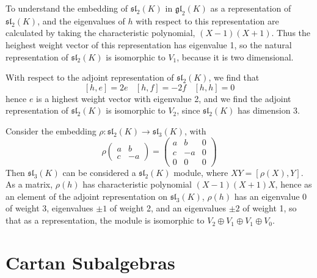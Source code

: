 \begin{example}
    To understand the embedding of $\mathfrak{sl}_2(K)$ in $\mathfrak{gl}_2(K)$ as a representation of $\mathfrak{sl}_2(K)$, and the eigenvalues of $h$ with respect to this representation are calculated by taking the characteristic polynomial, $(X - 1)(X + 1)$. Thus the heighest weight vector of this representation has eigenvalue 1, so the natural representation of $\mathfrak{sl}_2(K)$ is isomorphic to $V_1$, because it is two dimensional.
\end{example}

\begin{example}
    With respect to the adjoint representation of $\mathfrak{sl}_2(K)$, we find that
    \[ [h,e] = 2e\ \ \ \ [h,f] = -2f\ \ \ \ [h,h] = 0 \]
    hence $e$ is a highest weight vector with eigenvalue 2, and we find the adjoint representation of $\mathfrak{sl}_2(K)$ is isomorphic to $V_2$, since $\mathfrak{sl}_2(K)$ has dimension 3.
\end{example}

\begin{example}
    Consider the embedding $\rho: \mathfrak{sl}_2(K) \to \mathfrak{sl}_3(K)$, with
    \[ \rho \begin{pmatrix} a & b \\ c & -a \end{pmatrix} = \begin{pmatrix} a & b & 0 \\ c & -a & 0 \\ 0 & 0 & 0 \end{pmatrix} \]
    Then $\mathfrak{sl}_3(K)$ can be considered a $\mathfrak{sl}_2(K)$ module, where $XY = [\rho(X),Y]$. As a matrix, $\rho(h)$ has characteristic polynomial $(X - 1)(X + 1)X$, hence as an element of the adjoint representation on $\mathfrak{sl}_3(K)$, $\rho(h)$ has an eigenvalue 0 of weight 3, eigenvalues $\pm 1$ of weight 2, and an eigenvalues $\pm 2$ of weight 1, so that as a representation, the module is isomorphic to $V_2 \oplus V_1 \oplus V_1 \oplus V_0$.
\end{example}


\section{Cartan Subalgebras}

